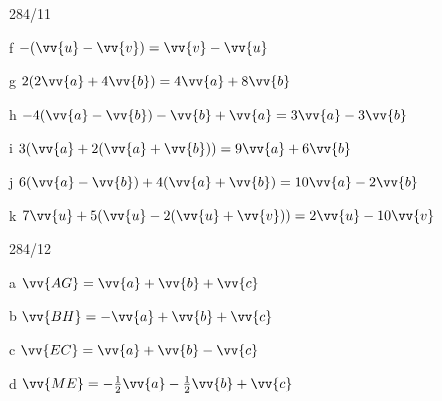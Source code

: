 \begin{exercise}{284/11}
  \item [f] $-(\vv{u} - \vv{v}) = \vv{v} - \vv{u}$
  \item [g] $2(2\vv{a} + 4\vv{b}) = 4\vv{a} + 8\vv{b}$
  \item [h] $-4(\vv{a} - \vv{b}) - \vv{b} + \vv{a} = 3\vv{a} - 3\vv{b}$
  \item [i] $3(\vv{a} + 2(\vv{a} + \vv{b})) = 9\vv{a} + 6\vv{b}$
  \item [j] $6(\vv{a} - \vv{b}) + 4(\vv{a} + \vv{b}) = 10\vv{a} - 2\vv{b}$
  \item [k] $7\vv{u} + 5(\vv{u} - 2(\vv{u} + \vv{v})) = 2\vv{u} - 10\vv{v}$
\end{exercise}
\begin{exercise}{284/12}
  \item [a] $\vv{AG} = \vv{a} + \vv{b} + \vv{c}$
  \item [b] $\vv{BH} = -\vv{a} + \vv{b} + \vv{c}$
  \item [c] $\vv{EC} = \vv{a} + \vv{b} - \vv{c}$
  \item [d] $\vv{ME} = -\frac{1}{2}\vv{a} - \frac{1}{2}\vv{b} + \vv{c}$
\end{exercise}
